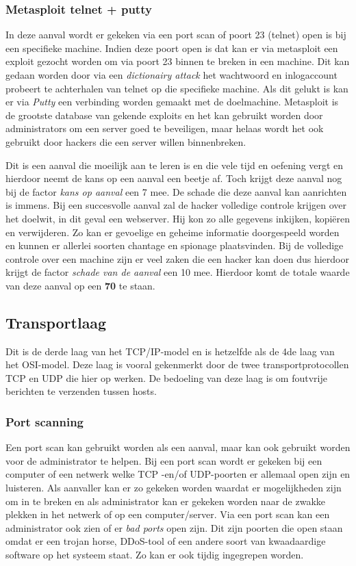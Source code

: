\documentclass[pdftex,a4paper,12pt]{report}
\begin{document}
\subsubsection{Metasploit telnet + putty}
In deze aanval wordt er gekeken via een port scan of poort 23 (telnet) open is bij een specifieke machine. Indien deze poort open is dat kan er via metasploit een exploit gezocht worden om via poort 23 binnen te breken in een machine. Dit kan gedaan worden door via een \textit{dictionairy attack} het wachtwoord en inlogaccount probeert te achterhalen van telnet op die specifieke machine. Als dit gelukt is kan er via \textit{Putty} een verbinding worden gemaakt met de doelmachine. Metasploit is de grootste database van gekende exploits en het kan gebruikt worden door administrators om een server goed te beveiligen, maar helaas wordt het ook gebruikt door hackers die een server willen binnenbreken. \citep{majestro2014} \newline

Dit is een aanval die moeilijk aan te leren is en die vele tijd en oefening vergt en hierdoor neemt de kans op een aanval een beetje af. Toch krijgt deze aanval nog bij de factor \textit{kans op aanval} een 7 mee. De schade die deze aanval kan aanrichten is immens. Bij een succesvolle aanval zal de hacker volledige controle krijgen over het doelwit, in dit geval een webserver. Hij kon zo alle gegevens inkijken, kopiëren en verwijderen. Zo kan er gevoelige en geheime informatie doorgespeeld worden en kunnen er allerlei soorten chantage en spionage plaatsvinden. Bij de volledige controle over een machine zijn er veel zaken die een hacker kan doen dus hierdoor krijgt de factor \textit{schade van de aanval} een 10 mee. Hierdoor komt de totale waarde van deze aanval op een \textbf{70} te staan.

\subsection{Transportlaag}
Dit is de derde laag van het TCP/IP-model en is hetzelfde als de 4de laag van het OSI-model. Deze laag is vooral gekenmerkt door de twee transportprotocollen TCP en UDP die hier op werken. De bedoeling van deze laag is om foutvrije berichten te verzenden tussen hosts. \citep{Thomas2013}

\subsubsection{Port scanning}
Een port scan kan gebruikt worden als een aanval, maar kan ook gebruikt worden voor de administrator te helpen. Bij een port scan wordt er gekeken bij een computer of een netwerk welke TCP -en/of UDP-poorten er allemaal open zijn en luisteren. Als aanvaller kan er zo gekeken worden waardat er mogelijkheden zijn om in te breken en als administrator kan er gekeken worden naar de zwakke plekken in het netwerk of op een computer/server. Via een port scan kan een administrator ook zien of er \textit{bad ports} open zijn. Dit zijn poorten die open staan omdat er een trojan horse, DDoS-tool of een andere soort van kwaadaardige software op het systeem staat. Zo kan er ook tijdig ingegrepen worden. \citep{Kessler2001} \newline
\end{document}
